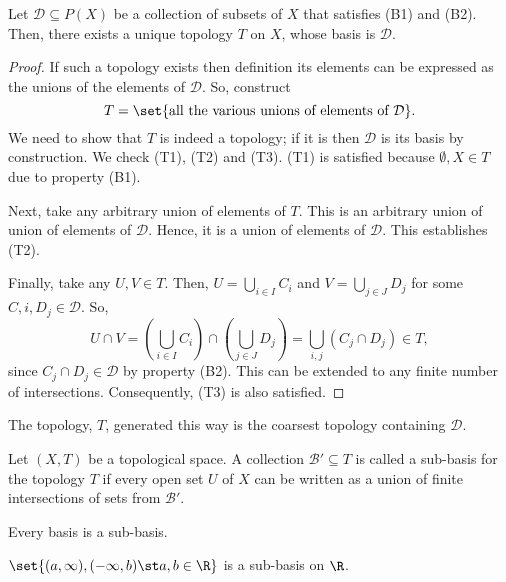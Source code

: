 \begin{nlemma}
  Let $\mathcal{D} \subseteq P(X)$ be a collection of subsets of $X$ that satisfies (B1) and (B2). Then, there exists a unique topology $T$ on $X$, whose basis is $\mathcal{D}$.
\end{nlemma}
\begin{proof}
  If such a topology exists then definition its elements can be expressed as the unions of the elements of $\mathcal{D}$. So, construct
  \begin{equation*}
    T = \set{\text{all the various unions of elements of } \mathcal{D}}.
  \end{equation*}
  We need to show that $T$ is indeed a topology; if it is then $\mathcal{D}$ is its basis by construction. We check (T1), (T2) and (T3). (T1) is satisfied because $\emptyset, X \in T$ due to property (B1).

  Next, take any arbitrary union of elements of $T$. This is an arbitrary union of union of elements of $\mathcal{D}$. Hence, it is a union of elements of $\mathcal{D}$. This establishes (T2).

  Finally, take any $U, V \in T$. Then, $U = \bigcup_{i\in I} C_i$ and $V = \bigcup_{j \in J} D_j$ for some $C,i, D_j \in \mathcal{D}$. So,
  \begin{equation*}
    U \cap V = \left(\bigcup_{i\in I} C_i\right) \cap \left(\bigcup_{j \in J} D_j\right)
    = \bigcup_{i,j} \left(C_j \cap D_j\right) \in T,
  \end{equation*}
  since $C_j \cap D_j \in \mathcal{D}$ by property (B2). This can be extended to any finite number of intersections. Consequently, (T3) is also satisfied.
\end{proof}
The topology, $T$, generated this way is the coarsest topology containing $\mathcal{D}$.

\begin{ndfn}
  Let $(X,T)$ be a topological space. A collection $\mathcal{B}' \subseteq T$ is called a sub-basis for the topology $T$ if every open set $U$ of $X$ can be written as a union of finite intersections of sets from $\mathcal{B}'$.
\end{ndfn}

\begin{nprop}
  Every basis is a sub-basis.
\end{nprop}

\begin{negg}
  $\set{(a,\infty), (-\infty,b) \st a,b \in \R}$ is a sub-basis on $\R$.\eggqed
\end{negg}

